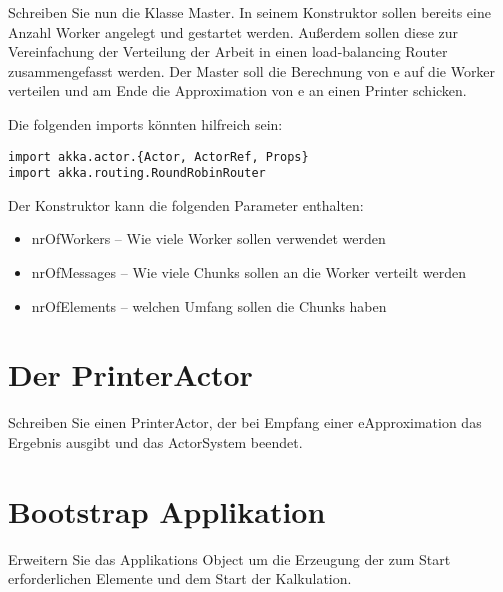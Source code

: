 \documentclass[11pt]{tudexercise}
\begin{document}
Schreiben Sie nun die Klasse Master. In seinem Konstruktor sollen bereits eine Anzahl Worker angelegt und gestartet werden. Außerdem sollen diese zur Vereinfachung der Verteilung der Arbeit in einen load-balancing Router zusammengefasst werden. Der Master soll die Berechnung von e auf die Worker verteilen und am Ende die Approximation von e an einen Printer schicken.

Die folgenden imports könnten hilfreich sein:
\begin{verbatim}
import akka.actor.{Actor, ActorRef, Props}
import akka.routing.RoundRobinRouter
\end{verbatim}

Der Konstruktor kann die folgenden Parameter enthalten:
\begin{itemize}
\item nrOfWorkers – Wie viele Worker sollen verwendet werden
\item nrOfMessages – Wie viele Chunks sollen an die Worker verteilt werden
\item nrOfElements – welchen Umfang sollen die Chunks haben
\end{itemize}

\section{Der PrinterActor}

Schreiben Sie einen PrinterActor, der bei Empfang einer eApproximation das Ergebnis ausgibt und das ActorSystem beendet.

\section{Bootstrap Applikation}

Erweitern Sie das Applikations Object um die Erzeugung der zum Start erforderlichen Elemente und dem Start der Kalkulation.
\end{document}
